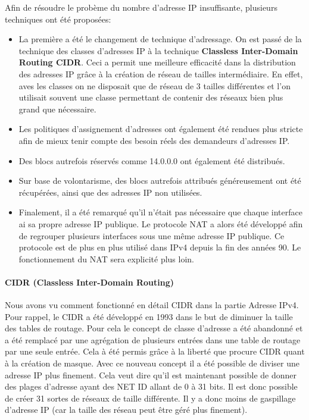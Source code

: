 Afin de résoudre le probème du nombre d'adresse IP insuffisante, plusieurs
techniques ont été proposées:
\begin{itemize}
\item La première a été le changement de technique d'adressage. On est passé de
la technique des classes d'adresses IP à la technique \textbf{Classless
Inter-Domain Routing CIDR}. Ceci a permit une meilleure efficacité dans la
distribution des adresses IP grâce à la création de réseau de tailles
intermédiaire. En effet, aves les classes on ne disposait que de réseau de 3
tailles différentes et l'on utilisait souvent une classe permettant de contenir
des réseaux bien plus grand que nécessaire.

\item Les politiques d'assignement d'adresses ont également été rendues plus
stricte afin de mieux tenir compte des besoin réels des demandeurs d'adresses
IP.

\item Des blocs autrefois réservés comme 14.0.0.0 ont également été distribués.

\item Sur base de volontarisme, des blocs autrefois attribués généreusement ont
été récupérées, ainsi que des adresses IP non utilisées.

\item Finalement, il a été remarqué qu'il n'était pas nécessaire que chaque
interface ai sa propre adresse IP publique. Le protocole NAT a alors été
développé afin de regrouper plusieurs interfaces sous une même adresse IP
publique. Ce protocole est de plus en plus utilisé dans IPv4 depuis la fin des
années 90. Le fonctionnement du NAT sera explicité plus loin.
\end{itemize}


\paragraph{CIDR (Classless Inter-Domain Routing)}
Nous avons vu comment fonctionné en détail CIDR dans la partie Adresse IPv4.
Pour rappel, le CIDR a été développé en 1993 dans le but de diminuer la taille
des tables de routage. Pour cela le concept de classe d'adresse a été abandonné
et a été remplacé par une agrégation de plusieurs entrées dans une table de
routage par une seule entrée.  Cela à été permis grâce à la liberté que procure
CIDR quant à la création de masque.  Avec ce nouveau concept il a été possible
de diviser une adresse IP plus finement. Cela veut dire qu'il est maintenant
possible de donner des plages d'adresse ayant des NET ID allant de 0 à 31 bits.
Il est donc possible de créer 31 sortes de réseaux de taille différente. Il y a
donc moins de gaspillage d'adresse IP (car la taille des réseau peut être géré
plus finement).

